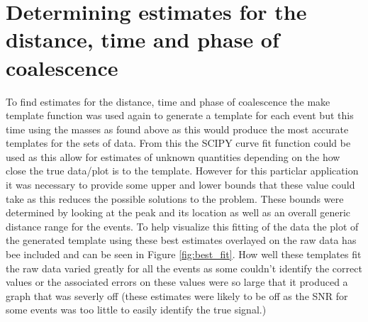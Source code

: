 \documentclass[]{article}
\begin{document}
\section*{Determining estimates for the distance, time and phase of coalescence}



To find estimates for the distance, time and phase of coalescence the make template function was used again
to generate a template for each event but this time using the masses as found above
as this would produce the most accurate templates for the sets of data.
From this the SCIPY curve fit function could be used as this allow for estimates of unknown quantities depending on the
how close the true data/plot is to the template. However for this particlar application
it was necessary to provide some upper and lower bounds that these value could take as this reduces the possible solutions
to the problem. These bounds were determined by looking at the peak and its location as well as an overall generic distance range
for the events. To help visualize this fitting of the data the plot of the generated template using these best estimates
overlayed on the raw data has bee included and can be seen in Figure \ref{fig:best_fit}.
How well these templates fit the raw data varied greatly for all the events as some couldn't identify the correct values
or the associated errors on these values were so large that it produced a graph that was severly off (these estimates were likely to be off
as the SNR for some events was too little to easily identify the true signal.)
\end{document}
